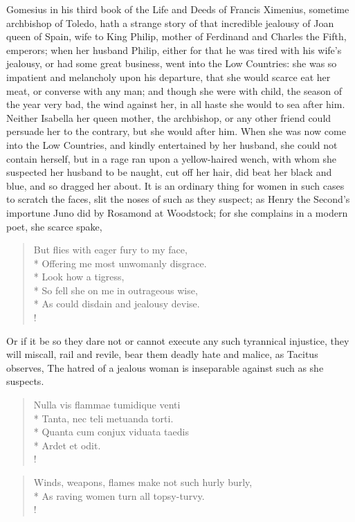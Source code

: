 Gomesius in his third book of the Life and Deeds of Francis Ximenius,
sometime archbishop of Toledo, hath a strange story of that incredible
jealousy of Joan queen of Spain, wife to King Philip, mother of
Ferdinand and Charles the Fifth, emperors; when her husband Philip,
either for that he was tired with his wife's jealousy, or had some
great business, went into the Low Countries: she was so impatient and
melancholy upon his departure, that she would scarce eat her meat, or
converse with any man; and though she were with child, the season of
the year very bad, the wind against her, in all haste she would to sea
after him. Neither Isabella her queen mother, the archbishop, or any
other friend could persuade her to the contrary, but she would after
him. When she was now come into the Low Countries, and kindly
entertained by her husband, she could not contain herself, but in
a rage ran upon a yellow-haired wench, with whom she suspected her
husband to be naught, cut off her hair, did beat her black and blue,
and so dragged her about. It is an ordinary thing for women in such
cases to scratch the faces, slit the noses of such as they suspect; as
Henry the Second's importune Juno did by Rosamond at Woodstock; for she
complains in a modern poet, she scarce spake,

\begin{verse}
But flies with eager fury to my face,\\*
Offering me most unwomanly disgrace.\\*
Look how a tigress, \etc{}\\*
So fell she on me in outrageous wise,\\*
As could disdain and jealousy devise.\\!
\end{verse}

Or if it be so they dare not or cannot execute any such tyrannical injustice,
they will miscall, rail and revile, bear them deadly hate and malice, as
Tacitus observes, The hatred of a jealous woman is
inseparable against such as she suspects.
%
\begin{latin}%
\begin{verse}%
Nulla vis flammae tumidique venti\\*
Tanta, nec teli metuanda torti.\\*
Quanta cum conjux viduata taedis\\*
Ardet et odit.\\!
\end{verse}%
\end{latin}%
\translationrule%
\begin{verse}%
Winds, weapons, flames make not such hurly burly,\\*
As raving women turn all topsy-turvy.\\!
\end{verse}%
%

